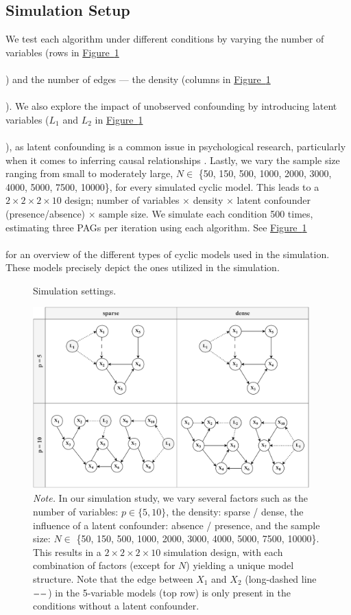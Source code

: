 \documentclass[twoside, 11pt]{article}
\newcommand{\thickdash}{%
\begin{tikzpicture}
[baseline=-0.7mm]
\draw [line width= 0.6pt, dash pattern={on 6pt off 2pt}] (0,0) -- (0.5,0);
\end{tikzpicture}
}
\newcommand*{\figref}[2][]{%
  \hyperref[{fig:#2}]{%
    Figure~\ref*{fig:#2}%
    \ifx\\#1\\%
    \else
      #1%
    \fi
  }%
}
\begin{document}
\subsection{Simulation Setup}
We test each algorithm under different conditions by varying the number of variables (rows in \figref{11}) and the number of edges --- the density (columns in \figref{11}). We also explore the impact of unobserved confounding by introducing latent variables ($L_1$ and $L_2$ in \figref{11}), as latent confounding is a common issue in psychological research, particularly when it comes to inferring causal relationships \citep{hallquist2019, rohr2022}. Lastly, we vary the sample size ranging from small to moderately large, $N \in$ \{50, 150, 500, 1000, 2000, 3000, 4000, 5000, 7500, 10000\}, for every simulated cyclic model. This leads to a $2 \times 2 \times 2 \times 10$ design; number of variables $\times$ density $\times$ latent confounder (presence/absence) $\times$ sample size. We simulate each condition 500 times, estimating three PAGs per iteration using each algorithm. See \figref[]{11} for an overview of the different types of cyclic models used in the simulation. These models precisely depict the ones utilized in the simulation.


\begin{figure}[!b]
    \centering
        \caption{Simulation settings.}
        \includegraphics[width=0.95\textwidth]{figures/Fig11.pdf}
        \vspace*{1mm}
        \caption*{\small{\textit{Note.} In our simulation study, we vary several factors such as the number of variables: $p \in \{5, 10\}$, the density: sparse / dense, the influence of a latent confounder: absence / presence, and the sample size: $N \in$ \{50, 150, 500, 1000, 2000, 3000, 4000, 5000, 7500, 10000\}. This results in a $2 \times 2 \times 2 \times 10$ simulation design, with each combination of factors (except for $N$) yielding a unique model structure. Note that the edge between $X_1$ and $X_2$ (long-dashed line $\thickdash$) in the 5-variable models (top row) is only present in the conditions without a latent confounder.}}
    \label{fig:11}
\end{figure}
 
\end{document}
